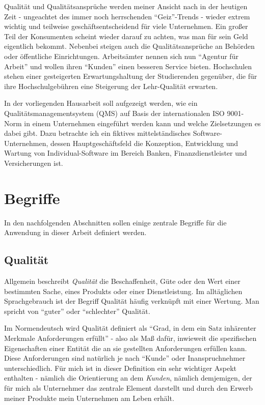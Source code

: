 Qualität und Qualitätsansprüche werden meiner Ansicht nach in der heutigen Zeit 
- ungeachtet des immer noch herrschenden "`Geiz"'-Trends - wieder extrem 
wichtig und teilweise geschäftsentscheidend für viele Unternehmen. Ein großer
Teil der Konsumenten scheint wieder darauf zu achten, was man für sein Geld
eigentlich bekommt. Nebenbei steigen auch die Qualitätsansprüche an Behörden
oder öffentliche Einrichtungen. Arbeitsämter nennen sich nun "`Agentur für
Arbeit"' und wollen ihren "`Kunden"' einen besseren Service bieten. Hochschulen
stehen einer gesteigerten Erwartungshaltung der Studierenden gegenüber, die für
ihre Hochschulgebühren eine Steigerung der Lehr-Qualität erwarten.

In der vorliegenden Hausarbeit soll aufgezeigt werden, wie ein 
Qualitätsmanagementsystem (QMS) auf Basis der internationalen ISO 9001-Norm in 
einem Unternehmen eingeführt werden kann und welche Zielsetzungen es dabei 
gibt. Dazu betrachte ich ein fiktives mittelständisches Software-Unternehmen, 
dessen Hauptgeschäftsfeld die Konzeption, Entwicklung und Wartung von 
Individual-Software im Bereich Banken, Finanzdienstleister und Versicherungen 
ist.

\section{Begriffe}
In den nachfolgenden Abschnitten sollen einige zentrale Begriffe für die
Anwendung in dieser Arbeit definiert werden.

\subsection{Qualität}
Allgemein beschreibt \emph{Qualität} die Beschaffenheit, Güte oder den Wert 
einer bestimmten Sache, eines Produkts oder einer Dienstleistung. Im 
alltäglichen Sprachgebrauch ist der Begriff Qualität häufig verknüpft mit einer 
Wertung. Man spricht von "`guter"' oder "`schlechter"' Qualität.

Im Normendeutsch wird Qualität definiert als "`Grad, in dem ein Satz inhärenter 
Merkmale Anforderungen erfüllt"' \cite[S.~18]{din9000} - also als Maß dafür, 
inwieweit die spezifischen Eigenschaften einer Entität die an sie gestellten 
Anforderungen erfüllen kann. Diese Anforderungen sind natürlich je nach 
"`Kunde"' oder Inanspruchnehmer unterschiedlich. Für mich ist in dieser 
Definition ein sehr wichtiger Aspekt enthalten - nämlich die Orientierung an 
dem \emph{Kunden}, nämlich demjemigen, der für mich als Unternehmer das 
zentrale Element darstellt und durch den Erwerb meiner Produkte mein 
Unternehmen am Leben erhält.

